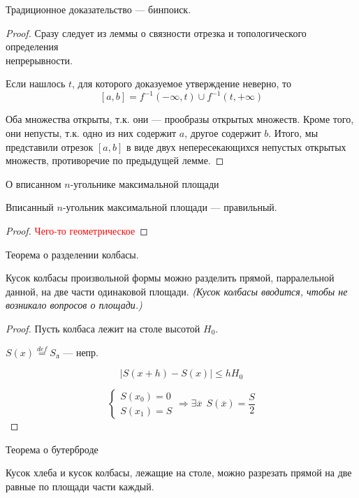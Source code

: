     Традиционное доказательство --- бинпоиск.
    \begin{proof}
        Сразу следует из леммы о связности отрезка и топологического определения\\непрерывности.

        Если нашлось $t$, для которого доказуемое утверждение неверно, то $$[a,b]=f^{-1}(-\infty, t)\cup f^{-1}(t, +\infty)$$

        Оба множества открыты, т.к. они --- прообразы открытых множеств. Кроме того, они непусты, т.к. одно из них содержит $a$, другое содержит $b$. Итого, мы представили отрезок $[a,b]$ в виде двух непересекающихся непустых открытых множеств, противоречие по предыдущей лемме.
    \end{proof}
    \begin{theorem}
        О вписанном $n$-угольнике максимальной площади
        
        Вписанный $n$-угольник максимальной площади --- правильный.
    \end{theorem}
    \begin{proof}
        \textcolor{red}{Чего-то геометрическое}
    \end{proof}
    \begin{theorem}
        Теорема о разделении колбасы.

        Кусок колбасы произвольной формы можно разделить прямой, парралельной данной, на две части одинаковой площади. \textit{(Кусок колбасы вводится, чтобы не возникало вопросов о площади.)}
    \end{theorem}
    \begin{proof}
        Пусть колбаса лежит на столе высотой $H_0$.

        $S(x)\stackrel{def}{=}S_{\text{л}}$ --- непр.

        $$|S(x+h)-S(x)|\leq hH_0$$

        $$\begin{cases}
            S(x_0)=0 \\
            S(x_1)=S
        \end{cases} \Rightarrow \exists \overline x \ \ S(\overline x)=\frac{S}{2}$$
    \end{proof}
    \begin{theorem}
        Теорема о бутерброде

        Кусок хлеба и кусок колбасы, лежащие на столе, можно разрезать прямой на две равные по площади части каждый.
    \end{theorem}
